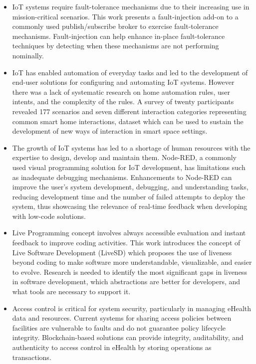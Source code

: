 \documentclass[11pt]{article}
\begin{document}
\begin{itemize}
\item {}

    IoT systems require fault-tolerance mechanisms due to their increasing use in mission-critical scenarios. This work presents a fault-injection add-on to a commonly used publish/subscribe broker to exercise fault-tolerance mechanisms. Fault-injection can help enhance in-place fault-tolerance techniques by detecting when these mechanisms are not performing nominally.
    
\item {}

    IoT has enabled automation of everyday tasks and led to the development of end-user solutions for configuring and automating IoT systems. However there was a lack of systematic research on home automation rules, user intents, and the complexity of the rules. A survey of twenty participants revealed 177 scenarios and seven different interaction categories representing common smart home interactions, dataset which can be used to sustain the development of new ways of interaction in smart space settings.

\item {}

    The growth of IoT systems has led to a shortage of human resources with the expertise to design, develop and maintain them. Node-RED, a commonly used visual programming solution for IoT development, has limitations such as inadequate debugging mechanisms. Enhancements to Node-RED can improve the user's system development, debugging, and understanding tasks, reducing development time and the number of failed attempts to deploy the system, thus showcasing the relevance of real-time feedback when developing with low-code solutions.
    
\item {}

Live Programming concept involves always accessible evaluation and instant feedback to improve coding activities. This work introduces the concept of Live Software Development (LiveSD) which proposes the use of liveness beyond coding to make software more understandable, visualizable, and easier to evolve. Research is needed to identify the most significant gaps in liveness in software development, which abstractions are better for developers, and what tools are necessary to support it.



\item {}

Access control is critical for system security, particularly in managing eHealth data and resources. Current systems for sharing access policies between facilities are vulnerable to faults and do not guarantee policy lifecycle integrity. Blockchain-based solutions can provide integrity, auditability, and authenticity to access control in eHealth by storing operations as transactions.

\end{itemize}
\end{document}
